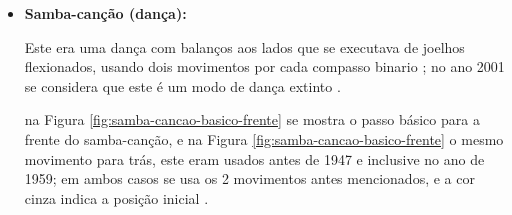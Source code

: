 \begin{itemize}

\item \textbf{Samba-canção (dança):}

Este era uma dança com balanços aos lados que se executava de joelhos flexionados,
usando dois movimentos por cada compasso binario \cite[pp. 58]{freitas1959danca} 
\cite[pp. 51]{fornaciari1947aprender} \cite[pp. 143]{perna2002samba}; 
no ano 2001 se considera que este é um modo de dança extinto \cite[pp. 143]{perna2002samba}.

na Figura \ref{fig:samba-cancao-basico-frente} se mostra o passo básico para a frente do samba-canção,
e na  Figura \ref{fig:samba-cancao-basico-frente} o mesmo movimento para trás,
este eram usados antes de 1947 e inclusive no ano de 1959;
em ambos casos se usa os 2 movimentos antes mencionados, e a cor cinza indica a posição inicial \cite[pp. 51]{fornaciari1947aprender} \cite[pp. 59-60]{freitas1959danca}. 
\begin{figure}[h]
    \centering
    \begin{subfigure}[b]{0.4\textwidth}
        \centering

\end{subfigure}
\end{figure}
\end{itemize}
